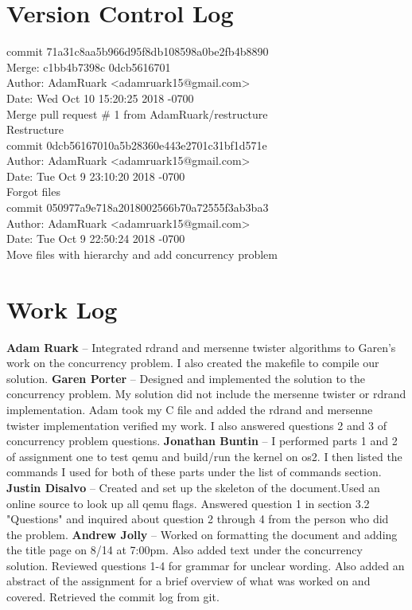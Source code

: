 \documentclass[onecolumn, draftclsnofoot,10pt, compsoc]{article}
\begin{document}
\section{Version Control Log}
commit 71a31c8aa5b966d95f8db108598a0be2fb4b8890 \\
Merge: c1bb4b7398c 0dcb5616701 \\
Author: AdamRuark <adamruark15@gmail.com> \\
Date:   Wed Oct 10 15:20:25 2018 -0700 \\

    Merge pull request \# 1 from AdamRuark/restructure \\
    
    Restructure \\

\noindent commit 0dcb56167010a5b28360e443e2701c31bf1d571e \\
Author: AdamRuark <adamruark15@gmail.com> \\
Date:   Tue Oct 9 23:10:20 2018 -0700 \\

    Forgot files \\

\noindent commit 050977a9e718a2018002566b70a72555f3ab3ba3 \\
Author: AdamRuark <adamruark15@gmail.com> \\
Date:   Tue Oct 9 22:50:24 2018 -0700 \\

    Move files with hierarchy and add concurrency problem \\
\section{Work Log}
    \textbf{Adam Ruark }-- Integrated rdrand and mersenne twister algorithms to Garen's work on the concurrency problem. I also created the makefile to compile our solution.\newline
    \textbf{Garen Porter} -- Designed and implemented the solution to the concurrency problem. My solution did not include the mersenne twister or rdrand implementation. Adam took my C file and added the rdrand and mersenne twister implementation verified my work. I also answered questions 2 and 3 of concurrency problem questions.\newline
    \textbf{Jonathan Buntin} -- I performed parts 1 and 2 of assignment one to test qemu and build/run the kernel on os2. I then listed the commands I used for both of these parts under the list of commands section.\newline
    \textbf{Justin Disalvo} -- Created and set up the skeleton of the document.Used an online source to look up all qemu flags. Answered question 1 in section 3.2 "Questions" and inquired about question 2 through 4 from the person who did the problem. \newline
    \textbf{Andrew Jolly} -- Worked on formatting the document and adding the title page on 8/14 at 7:00pm. Also added text under the concurrency solution. Reviewed questions 1-4 for grammar for unclear wording. Also added an abstract of the assignment for a brief overview of what was worked on and covered. Retrieved the commit log from git. \newline
\end{document}
